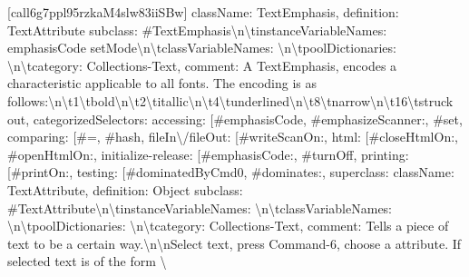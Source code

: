 { {[}call\textunderscore 6g7ppl95rzkaM4slw83iiSBw{]} \textbraceleft \textquotedbl{}className\textquotedbl{}: \textquotedbl{}TextEmphasis\textquotedbl{}, \textquotedbl{}definition\textquotedbl{}: \textquotedbl{}TextAttribute subclass: \#TextEmphasis\allowbreak\textbackslash n\allowbreak\textbackslash tinstanceVariableNames: \textquotesingle{}emphasisCode setMode\textquotesingle{}\allowbreak\textbackslash n\allowbreak\textbackslash tclassVariableNames: \textquotesingle{}\textquotesingle{}\allowbreak\textbackslash n\allowbreak\textbackslash tpoolDictionaries: \textquotesingle{}\textquotesingle{}\allowbreak\textbackslash n\allowbreak\textbackslash tcategory: \textquotesingle{}Collections-Text\textquotesingle{}\textquotedbl{}, \textquotedbl{}comment\textquotedbl{}: \textquotedbl{}A TextEmphasis, encodes a characteristic applicable to all fonts.  The encoding is as follows:\allowbreak\textbackslash n\allowbreak\textbackslash t1\allowbreak\textbackslash tbold\allowbreak\textbackslash n\allowbreak\textbackslash t2\allowbreak\textbackslash titallic\allowbreak\textbackslash n\allowbreak\textbackslash t4\allowbreak\textbackslash tunderlined\allowbreak\textbackslash n\allowbreak\textbackslash t8\allowbreak\textbackslash tnarrow\allowbreak\textbackslash n\allowbreak\textbackslash t16\allowbreak\textbackslash tstruck out\textquotedbl{}, \textquotedbl{}categorizedSelectors\textquotedbl{}: \textbraceleft \textquotedbl{}accessing\textquotedbl{}: {[}\textquotedbl{}\#emphasisCode\textquotedbl{}, \textquotedbl{}\#emphasizeScanner:\textquotedbl{}, \textquotedbl{}\#set\textquotedbl{}{]}, \textquotedbl{}comparing\textquotedbl{}: {[}\textquotedbl{}\#=\textquotedbl{}, \textquotedbl{}\#hash\textquotedbl{}{]}, \textquotedbl{}fileIn\allowbreak\textbackslash /fileOut\textquotedbl{}: {[}\textquotedbl{}\#writeScanOn:\textquotedbl{}{]}, \textquotedbl{}html\textquotedbl{}: {[}\textquotedbl{}\#closeHtmlOn:\textquotedbl{}, \textquotedbl{}\#openHtmlOn:\textquotedbl{}{]}, \textquotedbl{}initialize-release\textquotedbl{}: {[}\textquotedbl{}\#emphasisCode:\textquotedbl{}, \textquotedbl{}\#turnOff\textquotedbl{}{]}, \textquotedbl{}printing\textquotedbl{}: {[}\textquotedbl{}\#printOn:\textquotedbl{}{]}, \textquotedbl{}testing\textquotedbl{}: {[}\textquotedbl{}\#dominatedByCmd0\textquotedbl{}, \textquotedbl{}\#dominates:\textquotedbl{}{]}\textbraceright , \textquotedbl{}superclass\textquotedbl{}: \textbraceleft \textquotedbl{}className\textquotedbl{}: \textquotedbl{}TextAttribute\textquotedbl{}, \textquotedbl{}definition\textquotedbl{}: \textquotedbl{}Object subclass: \#TextAttribute\allowbreak\textbackslash n\allowbreak\textbackslash tinstanceVariableNames: \textquotesingle{}\textquotesingle{}\allowbreak\textbackslash n\allowbreak\textbackslash tclassVariableNames: \textquotesingle{}\textquotesingle{}\allowbreak\textbackslash n\allowbreak\textbackslash tpoolDictionaries: \textquotesingle{}\textquotesingle{}\allowbreak\textbackslash n\allowbreak\textbackslash tcategory: \textquotesingle{}Collections-Text\textquotesingle{}\textquotedbl{}, \textquotedbl{}comment\textquotedbl{}: \textquotedbl{}Tells a piece of text to be a certain way.\allowbreak\textbackslash n\allowbreak\textbackslash nSelect text, press Command-6, choose a attribute.  If selected text is of the form \allowbreak\textbackslash }
